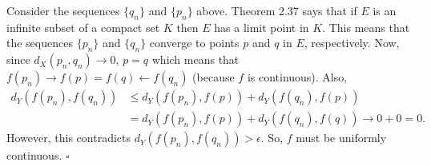 \documentclass[11pt]{article}
\begin{document}
Consider the sequences $\{ q_n\}$ and $\{ p_n\}$ above. Theorem 2.37 says that if $E$ is an infinite subset of a compact set $K$ then $E$ has a limit point in $K$. This means that the sequences $\{ p_n \}$ and $\{ q_n \}$ converge to points $p$ and $q$ in $E$, respectively. Now, since $d_X(p_n,q_n) \to 0$, $p=q$ which means that $f(p_{n}) \to f(p) = f(q) \leftarrow f(q_n)$ (because $f$ is continuous).  Also,
\begin{align*}
d_Y(f(p_{n}) , f(q_{n})) &\leq d_Y(f(p_{n}), f(p)) + d_Y(f(q_{n}), f(p))\\
&=  d_Y(f(p_{n}), f(p)) + d_Y(f(q_{n}), f(q)) \to 0 + 0 = 0.
\end{align*}
However, this contradicts $d_Y(f(p_n), f(q_n)) > \epsilon$. So, $f$ must be uniformly continuous. \hfill $\square$
  
\end{document}
